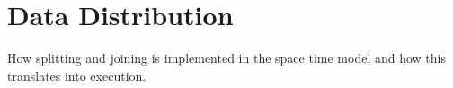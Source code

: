 \section{Data Distribution}
How splitting and joining is implemented in the space time model and
how this translates into execution.